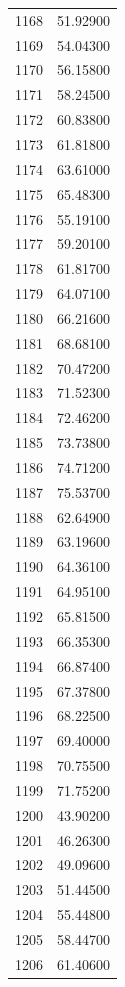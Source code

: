 \documentclass[
  letterpaper,
  DIV=11,
  numbers=noendperiod]{scrreprt}
\begin{document}
\begin{tcolorbox}
\begin{tabular}{lr}
1168 &         51.92900 \\
1169 &         54.04300 \\
1170 &         56.15800 \\
1171 &         58.24500 \\
1172 &         60.83800 \\
1173 &         61.81800 \\
1174 &         63.61000 \\
1175 &         65.48300 \\
1176 &         55.19100 \\
1177 &         59.20100 \\
1178 &         61.81700 \\
1179 &         64.07100 \\
1180 &         66.21600 \\
1181 &         68.68100 \\
1182 &         70.47200 \\
1183 &         71.52300 \\
1184 &         72.46200 \\
1185 &         73.73800 \\
1186 &         74.71200 \\
1187 &         75.53700 \\
1188 &         62.64900 \\
1189 &         63.19600 \\
1190 &         64.36100 \\
1191 &         64.95100 \\
1192 &         65.81500 \\
1193 &         66.35300 \\
1194 &         66.87400 \\
1195 &         67.37800 \\
1196 &         68.22500 \\
1197 &         69.40000 \\
1198 &         70.75500 \\
1199 &         71.75200 \\
1200 &         43.90200 \\
1201 &         46.26300 \\
1202 &         49.09600 \\
1203 &         51.44500 \\
1204 &         55.44800 \\
1205 &         58.44700 \\
1206 &         61.40600 \\

\end{tabular}
\end{tcolorbox}
\end{document}
